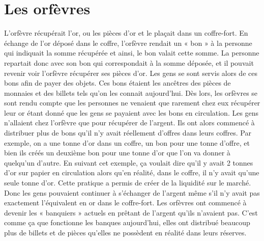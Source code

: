 \documentclass{bredele} %
\begin{document}
    \section*{Les orfèvres}
    L’orfèvre récupérait l’or, ou les pièces d’or et le plaçait dans un coffre-fort. En échange de l’or déposé dans le coffre, l’orfèvre rendait un « bon » à la personne qui indiquait la somme récupérée et ainsi, le bon valait cette somme. La personne repartait donc avec son bon qui correspondait à la somme déposée, et il pouvait revenir voir l’orfèvre récupérer ses pièces d’or. Les gens se sont servis alors de ces bons afin de payer des objets. Ces bons étaient les ancêtres des pièces de monnaies et des billets tels qu’on les connait aujourd’hui.
    \newline
    Dès lors, les orfèvres se sont rendu compte que les personnes ne venaient que rarement chez eux récupérer leur or étant donné que les gens se payaient avec les bons en circulation. Les gens n’allaient chez l’orfèvre que pour récupérer de l’argent.
    \newline
    Ils ont alors commencé à distribuer plus de bons qu’il n’y avait réellement d’offres dans leurs coffres.
    \newline
    Par exemple, on a une tonne d’or dans un coffre, un bon pour une tonne d’offre, et bien ils créés un deuxième bon pour une tonne d’or que l'on va donner à quelqu’un d’autre. En suivant cet exemple, ça voulait dire qu’il y avait 2 tonnes d’or sur papier en circulation alors qu’en réalité, dans le coffre, il n’y avait qu’une seule tonne d’or.
    \newline
    \newline
    Cette pratique a permis de créer de la liquidité sur le marché. Donc les gens pouvaient continuer à s’échanger de l’argent même s’il n’y avait pas exactement l’équivalent en or dans le coffre-fort.
    Les orfèvres ont commencé à devenir les « banquiers » actuels en prêtant de l’argent qu’ils n’avaient pas. C’est comme ça que fonctionne les banques aujourd’hui, elles ont distribué beaucoup plus de billets et de pièces qu’elles ne possèdent en réalité dans leurs réserves.

\end{document}
